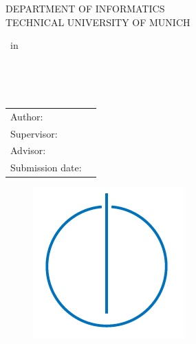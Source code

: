 \begin{titlepage}
	\setlength{\evensidemargin}{22pt}
	\setlength{\oddsidemargin}{22pt}
	\vspace{4cm}
	\hfill
	\begin{center}
		\oTUM{4cm}
		
		\vspace{5mm}     
		\huge DEPARTMENT OF INFORMATICS\\ 
		\vspace{0.5cm}
		\large TECHNICAL UNIVERSITY OF MUNICH\\
	\end{center}
	
	\vspace{5mm}
	
	\begin{center}
		{\Large \thesisType\ in \thesisUniversityFaculty}
		\vspace{8mm}
		
		\begin{spacing}{1.3}
			{\LARGE \thesisTitle}\\
			\vspace{8mm}
			
			{\LARGE \thesisTitleGer}\\
			\vspace{20mm}
		\end{spacing}
		
		\begin{tabular}{ll}
			\Large Author:     & \Large \thesisAuthor     \\[2mm]
			\Large Supervisor: & \Large \thesisSupervisor \\[2mm]				
			\Large Advisor:	   & \Large \thesisAdviser    \\[2mm]
			\Large Submission date:       & \Large \thesisDate
		\end{tabular}
		
		\vspace{20mm}
		
		\begin{figure}[hb!]
			\centering
			\includegraphics[width=0.2\linewidth]{gfx/infologo.jpg}
		\end{figure}
		
	\end{center}

\end{titlepage}


